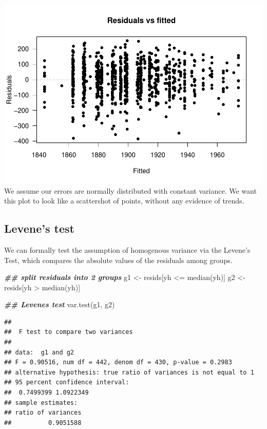 \documentclass[
]{article}
\newenvironment{Shaded}{\begin{snugshade}}{\end{snugshade}}
\newcommand{\DocumentationTok}[1]{\textcolor[rgb]{0.56,0.35,0.01}{\textbf{\textit{#1}}}}
\newcommand{\FunctionTok}[1]{\textcolor[rgb]{0.00,0.00,0.00}{#1}}
\newcommand{\NormalTok}[1]{#1}
\newcommand{\OtherTok}[1]{\textcolor[rgb]{0.56,0.35,0.01}{#1}}
\newcommand{\SpecialCharTok}[1]{\textcolor[rgb]{0.00,0.00,0.00}{#1}}
\begin{document}
\includegraphics{SCMU_egg_model_files/figure-latex/d5-1.pdf} We assume
our errors are normally distributed with constant variance. We want this
plot to look like a scattershot of points, without any evidence of
trends.

\hypertarget{levenes-test}{%
\subsection{Levene's test}\label{levenes-test}}

We can formally test the assumption of homogenous variance via the
Levene's Test, which compares the absolute values of the residuals among
groups.

\begin{Shaded}
\begin{Highlighting}[]
\DocumentationTok{\#\# split residuals into 2 groups}
\NormalTok{g1 }\OtherTok{\textless{}{-}}\NormalTok{ resids[yh }\SpecialCharTok{\textless{}=} \FunctionTok{median}\NormalTok{(yh)]}
\NormalTok{g2 }\OtherTok{\textless{}{-}}\NormalTok{ resids[yh }\SpecialCharTok{\textgreater{}} \FunctionTok{median}\NormalTok{(yh)]}

\DocumentationTok{\#\# Levene\textquotesingle{}s test}
\FunctionTok{var.test}\NormalTok{(g1, g2)}
\end{Highlighting}
\end{Shaded}

\begin{verbatim}
## 
##  F test to compare two variances
## 
## data:  g1 and g2
## F = 0.90516, num df = 442, denom df = 430, p-value = 0.2983
## alternative hypothesis: true ratio of variances is not equal to 1
## 95 percent confidence interval:
##  0.7499399 1.0922349
## sample estimates:
## ratio of variances 
##          0.9051588
\end{verbatim}
\end{document}
